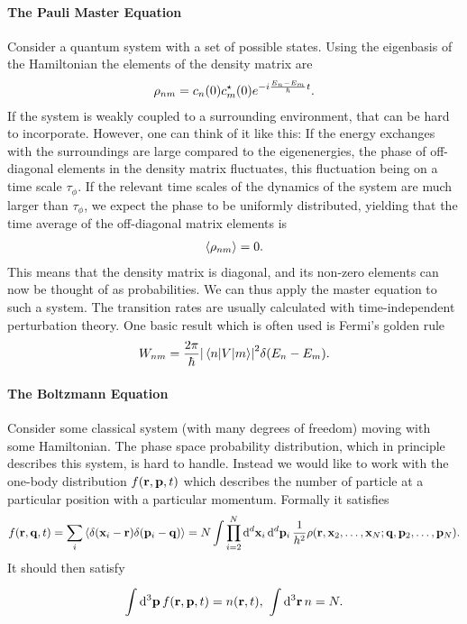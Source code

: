 \paragraph{The Pauli Master Equation}
Consider a quantum system with a set of possible states. Using the eigenbasis of the Hamiltonian the elements of the density matrix are
\begin{align*}
	\rho_{nm} = c_{n}(0)c^{\star}_{m}(0)e^{-i\frac{E_{n} - E_{m}}{\hbar}t}.
\end{align*}
If the system is weakly coupled to a surrounding environment, that can be hard to incorporate. However, one can think of it like this: If the energy exchanges with the surroundings are large compared to the eigenenergies, the phase of off-diagonal elements in the density matrix fluctuates, this fluctuation being on a time scale $\tau_{\phi}$. If the relevant time scales of the dynamics of the system are much larger than $\tau_{\phi}$, we expect the phase to be uniformly distributed, yielding that the time average of the off-diagonal matrix elements is
\begin{align*}
	\expval{\rho_{nm}} = 0.
\end{align*}
This means that the density matrix is diagonal, and its non-zero elements can now be thought of as probabilities. We can thus apply the master equation to such a system. The transition rates are usually calculated with time-independent perturbation theory. One basic result which is often used is Fermi's golden rule
\begin{align*}
	W_{nm} = \frac{2\pi}{\hbar}\abs{\mel{n}{V}{m}}^{2}\delta(E_{n} - E_{m}).
\end{align*}

\paragraph{The Boltzmann Equation}
Consider some classical system (with many degrees of freedom) moving with some Hamiltonian. The phase space probability distribution, which in principle describes this system, is hard to handle. Instead we would like to work with the one-body distribution $f(\vb{r}, \vb{p}, t)$ which describes the number of particle at a particular position with a particular momentum. Formally it satisfies
\begin{align*}
	f(\vb{r}, \vb{q}, t) = \sum\limits_{i}\expval{\delta(\vb{x}_{i} - \vb{r})\delta(\vb{p}_{i} - \vb{q})} = N\int\prod\limits_{i = 2}^{N}\dd[d]{\vb{x}_{i}}\dd[d]{\vb{p}_{i}}\frac{1}{h^{2}}\rho(\vb{r}, \vb{x}_{2}, \dots, \vb{x}_{N}; \vb{q}, \vb{p}_{2}, \dots, \vb{p}_{N}).
\end{align*}
It should then satisfy
\begin{align*}
	\integ[3]{}{}{\vb{p}}{f(\vb{r}, \vb{p}, t)} = n(\vb{r}, t),\ \integ[3]{}{}{\vb{r}}{n} = N.
\end{align*}

